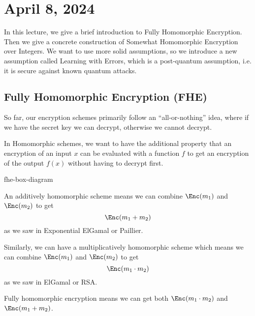 \section{April 8, 2024}
\label{20240408}

In this lecture, we give a brief introduction to Fully Homomorphic Encryption. Then we give a concrete construction of Somewhat Homomorphic Encryption over Integers. We want to use more solid assumptions, so we introduce a new assumption called Learning with Errors, which is a post-quantum assumption, i.e. it is secure against known quantum attacks.

\subsection{Fully Homomorphic Encryption (FHE)}

So far, our encryption schemes primarily follow an ``all-or-nothing'' idea, where if we have the secret key we can decrypt, otherwise we cannot decrypt.

In Homomorphic schemes, we want to have the additional property that an encryption of an input $x$ can be evaluated with a function $f$ to get an encryption of the output $f(x)$ without having to decrypt first.

\begin{center}
\begin{bbrenv}{fhe-box-diagram}
\begin{bbrbox}[name=Eval, namepos=center]
\end{bbrbox}
\end{bbrenv}
\end{center}

An additively homomorphic scheme means we can combine $\Enc(m_1)$ and $\Enc(m_2)$ to get
\[\Enc(m_1 + m_2)\]
as we saw in Exponential ElGamal or Paillier.

Similarly, we can have a multiplicatively homomorphic scheme which means we can combine $\Enc(m_1)$ and $\Enc(m_2)$ to get
\[\Enc(m_1 \cdot m_2)\]
as we saw in ElGamal or RSA.

Fully homomorphic encryption means we can get both $\Enc(m_1 \cdot m_2)$ and $\Enc(m_1 + m_2)$.

